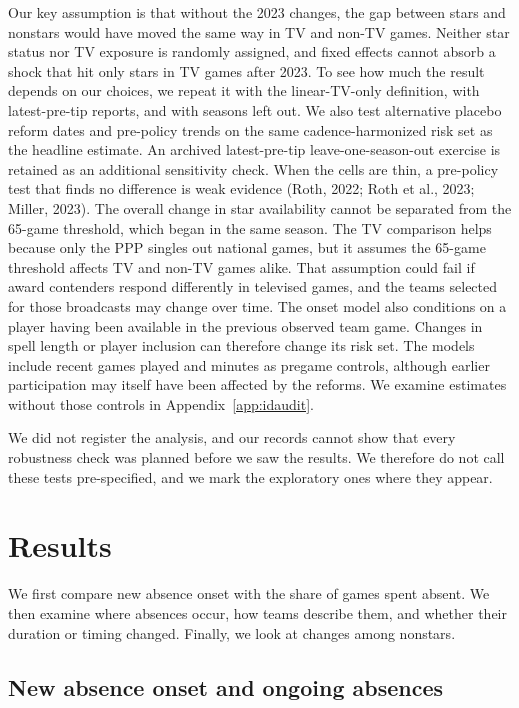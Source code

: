 \documentclass[11pt]{article}
\begin{document}
Our key assumption is that without the 2023 changes, the gap between stars and nonstars would have moved the same way in TV and non-TV games. Neither star status nor TV exposure is randomly assigned, and fixed effects cannot absorb a shock that hit only stars in TV games after 2023. To see how much the result depends on our choices, we repeat it with the linear-TV-only definition, with latest-pre-tip reports, and with seasons left out. We also test alternative placebo reform dates and pre-policy trends on the same cadence-harmonized risk set as the headline estimate. An archived latest-pre-tip leave-one-season-out exercise is retained as an additional sensitivity check. When the cells are thin, a pre-policy test that finds no difference is weak evidence (Roth, 2022; Roth et al., 2023; Miller, 2023). The overall change in star availability cannot be separated from the 65-game threshold, which began in the same season. The TV comparison helps because only the PPP singles out national games, but it assumes the 65-game threshold affects TV and non-TV games alike. That assumption could fail if award contenders respond differently in televised games, and the teams selected for those broadcasts may change over time. The onset model also conditions on a player having been available in the previous observed team game. Changes in spell length or player inclusion can therefore change its risk set. The models include recent games played and minutes as pregame controls, although earlier participation may itself have been affected by the reforms. We examine estimates without those controls in Appendix~\ref{app:idaudit}.

We did not register the analysis, and our records cannot show that every robustness check was planned before we saw the results. We therefore do not call these tests pre-specified, and we mark the exploratory ones where they appear.

\section{Results}\label{sec:results}

We first compare new absence onset with the share of games spent absent. We then examine where absences occur, how teams describe them, and whether their duration or timing changed. Finally, we look at changes among nonstars.

\subsection{New absence onset and ongoing absences}
\end{document}
